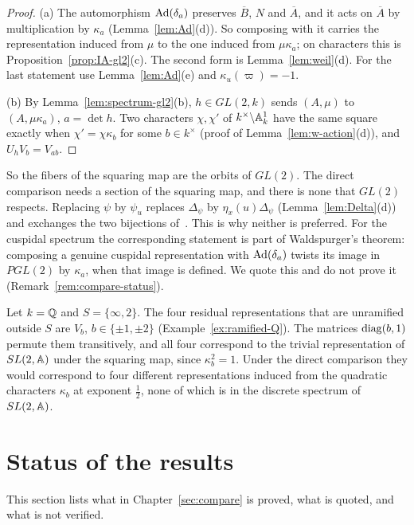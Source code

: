 \begin{proof}
(a) The automorphism $\operatorname{Ad}(\delta_a)$ preserves $\overline B$, $N$ and
$\overline A$, and it acts on $\overline A$ by multiplication by
$\kappa_a$ (Lemma~\ref{lem:Ad}(d)). So composing with it carries the
representation induced from $\mu$ to the one induced from $\mu\kappa_a$;
on characters this is Proposition~\ref{prop:IA-gl2}(c). The second form
is Lemma~\ref{lem:weil}(d). For the last statement use
Lemma~\ref{lem:Ad}(e) and $\kappa_u(\varpi)=-1$.

(b) By Lemma~\ref{lem:spectrum-gl2}(b), $h\in GL(2,k)$ sends $(A,\mu)$ to
$(A,\mu\kappa_a)$, $a=\det h$. Two characters $\chi,\chi'$ of
$k^\times\backslash\mathbb{A}_k^1$ have the same square exactly when
$\chi'=\chi\kappa_b$ for some $b\in k^\times$ (proof of
Lemma~\ref{lem:w-action}(d)), and $U_hV_b=V_{ab}$.
\end{proof}

So the fibers of the squaring map are the orbits of $GL(2)$. The direct
comparison needs a section of the squaring map, and there is none that
$GL(2)$ respects. Replacing $\psi$ by $\psi_u$ replaces $\Delta_\psi$ by
$\eta_x(u)\Delta_\psi$ (Lemma~\ref{lem:Delta}(d)) and exchanges the two
bijections of~\cite{JC26}. This is why neither is preferred. For the
cuspidal spectrum the corresponding statement is part of Waldspurger's
theorem: composing a genuine cuspidal representation with
$\operatorname{Ad}(\delta_a)$ twists its image in $PGL(2)$ by $\kappa_a$, when that
image is defined. We quote this and do not prove it
(Remark~\ref{rem:compare-status}).

\begin{example}\label{ex:fibers}
Let $k=\mathbb{Q}$ and $S=\{\infty,2\}$. The four residual representations that
are unramified outside $S$ are $V_b$, $b\in\{\pm1,\pm2\}$
(Example~\ref{ex:ramified-Q}). The matrices $\operatorname{diag}(b,1)$ permute them
transitively, and all four correspond to the trivial representation of
$SL(2,\mathbb{A})$ under the squaring map, since $\kappa_b^2=1$. Under the direct
comparison they would correspond to four different representations
induced from the quadratic characters $\kappa_b$ at exponent
$\frac12$, none of which is in the discrete spectrum of $SL(2,\mathbb{A})$.
\end{example}

\section{Status of the results}\label{sec:status-compare}

This section lists what in Chapter~\ref{sec:compare} is proved, what is
quoted, and what is not verified.

